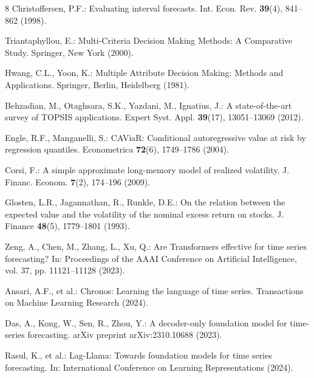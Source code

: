\documentclass[runningheads]{llncs}
\begin{document}
\begin{thebibliography}{8}
Christoffersen, P.F.: Evaluating interval forecasts. Int. Econ. Rev. \textbf{39}(4), 841--862 (1998).

Triantaphyllou, E.: Multi-Criteria Decision Making Methods: A Comparative Study. Springer, New York (2000).

Hwang, C.L., Yoon, K.: Multiple Attribute Decision Making: Methods and Applications. Springer, Berlin, Heidelberg (1981).

Behzadian, M., Otaghsara, S.K., Yazdani, M., Ignatius, J.: A state-of-the-art survey of TOPSIS applications. Expert Syst. Appl. \textbf{39}(17), 13051--13069 (2012).

Engle, R.F., Manganelli, S.: CAViaR: Conditional autoregressive value at risk by regression quantiles. Econometrica \textbf{72}(6), 1749--1786 (2004).

Corsi, F.: A simple approximate long-memory model of realized volatility. J. Financ. Econom. \textbf{7}(2), 174--196 (2009).

Glosten, L.R., Jagannathan, R., Runkle, D.E.: On the relation between the expected value and the volatility of the nominal excess return on stocks. J. Finance \textbf{48}(5), 1779--1801 (1993).

Zeng, A., Chen, M., Zhang, L., Xu, Q.: Are Transformers effective for time series forecasting? In: Proceedings of the AAAI Conference on Artificial Intelligence, vol. 37, pp. 11121--11128 (2023).

Ansari, A.F., et al.: Chronos: Learning the language of time series. Transactions on Machine Learning Research (2024).

Das, A., Kong, W., Sen, R., Zhou, Y.: A decoder-only foundation model for time-series forecasting. arXiv preprint arXiv:2310.10688 (2023).

Rasul, K., et al.: Lag-Llama: Towards foundation models for time series forecasting. In: International Conference on Learning Representations (2024).

\end{thebibliography}
\end{document}
